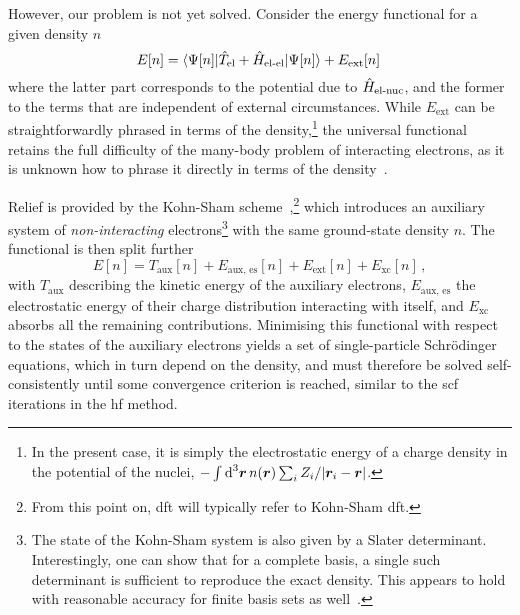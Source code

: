 However, our problem is not yet solved. Consider the energy functional for a given density $n$
\begin{equation}
	E[n] = \braket{\Psi[n] | \hat T_{\text{el}} + \hat H_{\text{el-el}} | \Psi[n]} + E_{\text{ext}}[n] \,
\end{equation}
where the latter part corresponds to the  potential due to $\hat H_{\text{el-nuc}}$, and the former to the  terms that are independent of external circumstances.
While $E_{\text{ext}}$ can be straightforwardly phrased in terms of the density,\footnote{In the present case, it is simply the electrostatic energy of a charge density in the potential of the nuclei, $- \int_{} \, \text{d}^3\boldsymbol{r}\,  n(\boldsymbol{r}) \sum_i Z_i/|\boldsymbol{r}_i - \boldsymbol{r}|$.} the universal functional retains the full difficulty of the many-body problem of interacting electrons, as it is unknown how to phrase it directly in terms of the density~\cite[ch.~6.4]{martin2020}.

Relief is provided by the Kohn-Sham scheme~\cite{ks1965p},\footnote{From this point on, \gls{dft} will typically refer to Kohn-Sham \gls{dft}.} which introduces an auxiliary system of \emph{non-interacting} electrons\footnote{The state of the Kohn-Sham system is also given by a Slater determinant.
Interestingly, one can show that for a complete basis, a single such determinant is sufficient to reproduce the exact density. This appears to hold with reasonable accuracy for finite basis sets as well~\cite{jj2020p}.
}
with the same ground-state density $n$. The functional is then split further
\begin{equation}
	E[n] = T_{\text{aux}}[n] + E_{\text{aux, es}}[n] + E_{\text{ext}}[n] + E_{\text{xc}}[n] \, ,
\end{equation}
with $T_{\text{aux}}$ describing the kinetic energy of the auxiliary electrons, $E_{\text{aux, es}}$ the electrostatic energy of their charge distribution interacting with itself, and $E_{\text{xc}}$ absorbs all the remaining contributions.
Minimising this functional with respect to the states of the auxiliary electrons yields a set of single-particle Schrödinger equations, which in turn depend on the density, and must therefore be solved self-consistently until some convergence criterion is reached, similar to the \gls{scf} iterations in the \gls{hf} method.

